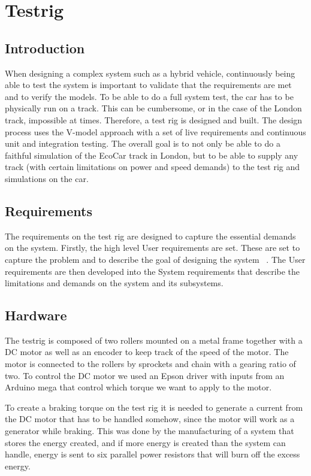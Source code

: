 \chapter{Testrig}
\section{Introduction}
When designing a complex system such as a hybrid vehicle, continuously being
able to test the system is important to validate that the requirements are met
and to verify the models. To be able to do a full system test, the car has to be
physically run on a track. This can be cumbersome, or in the case of the London
track, impossible at times. Therefore, a test rig is designed and built. The
design process uses the V-model approach with a set of live requirements and
continuous unit and integration testing. The overall goal is to not only be able
to do a faithful simulation of the EcoCar track in London, but to be able to
supply any track (with certain limitations on power and speed demands) to the
test rig and simulations on the car.

\section{Requirements}
The requirements on the test rig are designed to capture the essential demands
on the system. Firstly, the high level User requirements are set. These are set
to capture the problem and to describe the goal of designing the system
~\cite{ibm_req}. The User requirements are then developed into the System
requirements that describe the limitations and demands on the system and its
subsystems.

\section{Hardware}
The testrig is composed of two rollers mounted on a metal frame together with a DC motor as well as an encoder to keep track of the speed of the motor. The motor is connected to the rollers by sprockets and chain with a gearing ratio of two. To control the DC motor we used an Epson driver with inputs from an Arduino mega that control which torque we want to apply to the motor. 

To create a braking torque on the test rig it is needed to generate a current from the DC motor that has to be handled somehow, since the motor will work as a generator while braking. This was done by the manufacturing of a system that stores the energy created, and if more energy is created than the system can handle, energy is sent to six parallel power resistors that will burn off the excess energy. 

